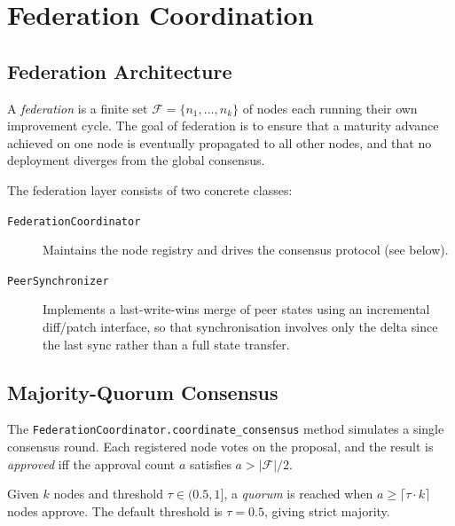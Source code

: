 \documentclass[11pt]{article}
\begin{document}
\section{Federation Coordination}\label{sec:federation}

\subsection{Federation Architecture}

A \emph{federation} is a finite set $\mathcal{F} = \{n_1, \ldots, n_k\}$ of
\JuGeo{} nodes each running their own improvement cycle.  The goal of
federation is to ensure that a maturity advance achieved on one node is
eventually propagated to all other nodes, and that no deployment diverges
from the global consensus.

The federation layer consists of two concrete classes:

\begin{description}
  \item[\texttt{FederationCoordinator}]  Maintains the node registry and
    drives the consensus protocol (see below).

  \item[\texttt{PeerSynchronizer}]  Implements a last-write-wins merge of
    peer states using an incremental diff/patch interface, so that
    synchronisation involves only the delta since the last sync rather than
    a full state transfer.
\end{description}

\subsection{Majority-Quorum Consensus}

The \texttt{FederationCoordinator.coordinate\_consensus} method simulates
a single consensus round.  Each registered node votes on the proposal, and
the result is \emph{approved} iff the approval count $a$ satisfies
$a > |\mathcal{F}|/2$.

\begin{definition}[Quorum]\label{def:quorum}
Given $k$ nodes and threshold $\tau \in (0.5, 1]$, a \emph{quorum} is
reached when $a \geq \lceil \tau \cdot k \rceil$ nodes approve.  The default
threshold is $\tau = 0.5$, giving strict majority.
\end{definition}
\end{document}
